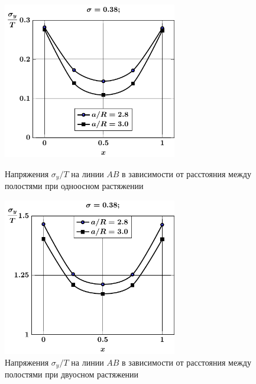 \begin{russian}
\begin{figure}[h!]
\centering\footnotesize
\parbox[b]{7.5cm}{\centering\includegraphics[width=7.6cm]{periodic-spheres-cav27-a-t1-sig_y.pdf}
\caption{Напряжения $\sigma_y/T$ на линии $AB$ в зависимости от расстояния между полостями при одноосном растяжении
\label{f:11:6}}}\hfil\hfil
\parbox[b]{7.5cm}{\centering\includegraphics[width=7.6cm]{periodic-spheres-cav27-a-t2-sig_y.pdf}
\caption{Напряжения $\sigma_y/T$ на линии $AB$ в зависимости от расстояния между полостями при двуосном растяжении
\label{f:11:7}}}
\end{figure}


\end{russian}
